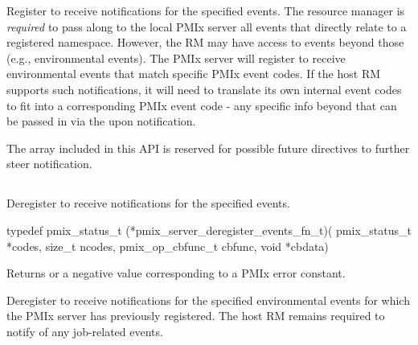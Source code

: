 \descr

Register to receive notifications for the specified events.
The resource manager is \emph{required} to pass along to the local PMIx server all events that directly relate to a registered namespace.
However, the RM may have access to events beyond those (e.g., environmental events).
The PMIx server will register to receive environmental events that match specific PMIx event codes.
If the host RM supports such notifications, it will need to translate its own internal event codes to fit into a corresponding PMIx event code - any specific info beyond that can be passed in via the  upon notification.

The  array included in this API is reserved for possible future directives to further steer notification.



\subsection{}

\summary

Deregister to receive notifications for the specified events.

\format

\cspecificstart
\begin{codepar}
 typedef pmix_status_t (*pmix_server_deregister_events_fn_t)(
                              pmix_status_t *codes, size_t ncodes,
                              pmix_op_cbfunc_t cbfunc, void *cbdata)
\end{codepar}
\cspecificend

\begin{arglist}
\end{arglist}

Returns  or a negative value corresponding to a PMIx error constant.

\descr

Deregister to receive notifications for the specified environmental events for which the PMIx server has previously registered.
The host RM remains required to notify of any job-related events.


